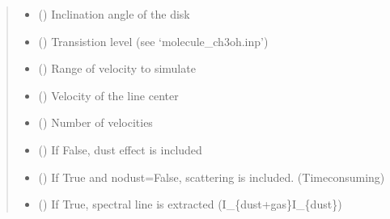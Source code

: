\documentclass[a4paper,11pt,english]{sphinxmanual}
\begin{document}
\begin{fulllineitems}
\begin{fulllineitems}
\begin{quote}
\begin{description}
\begin{itemize}
\item {} 
\sphinxAtStartPar
{} () \textendash{} Inclination angle of the disk

\item {} 
\sphinxAtStartPar
{} () \textendash{} Transistion level (see ‘molecule\_ch3oh.inp’)

\item {} 
\sphinxAtStartPar
{} () \textendash{} Range of velocity to simulate

\item {} 
\sphinxAtStartPar
{} () \textendash{} Velocity of the line center

\item {} 
\sphinxAtStartPar
{} () \textendash{} Number of velocities

\item {} 
\sphinxAtStartPar
{} () \textendash{} If False, dust effect is included

\item {} 
\sphinxAtStartPar
{} () \textendash{} If True and nodust=False, scattering is included. (Time\sphinxhyphen{}consuming)

\item {} 
\sphinxAtStartPar
{} () \textendash{} If True, spectral line is extracted (I\_\{dust+gas\}\sphinxhyphen{}I\_\{dust\})

\end{itemize}

\end{description}\end{quote}

\end{fulllineitems}



\end{fulllineitems}
\end{document}
